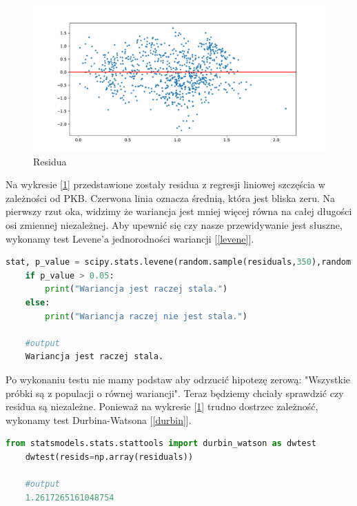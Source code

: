 \documentclass{article}
\theoremstyle{break}
\begin{document}
\begin{figure}[H]
	\begin{center}
		\includegraphics[scale=0.5]{res.pdf}
		\caption{Residua}
		\label{fig:res}
	\end{center}
\end{figure}

Na wykresie [\ref{fig:res}] przedstawione zostały residua z regresji liniowej szczęścia w zależności od PKB. Czerwona linia oznacza średnią, która jest bliska zeru. Na pierwszy rzut oka, widzimy że wariancja jest mniej więcej równa na całej długości osi zmiennej niezależnej. Aby upewnić się czy nasze przewidywanie jest słuszne, wykonamy test Levene'a jednorodności wariancji [\ref{levene}]. 

\begin{lstlisting}[language=Python, caption=Test Levene'a, label={levene}]
	stat, p_value = scipy.stats.levene(random.sample(residuals,350),random.sample(residuals,350))
	if p_value > 0.05:
		print("Wariancja jest raczej stala.")
	else:
		print("Wariancja raczej nie jest stala.")
		
	#output
	Wariancja jest raczej stala.
\end{lstlisting}

Po wykonaniu testu nie mamy podstaw aby odrzucić hipotezę zerową: "Wszystkie próbki są z populacji o równej wariancji". Teraz będziemy chciały sprawdzić czy residua są niezależne. Ponieważ na wykresie [\ref{fig:res}] trudno dostrzec zależność, wykonamy test Durbina-Watsona [\ref{durbin}].

\begin{lstlisting}[language=Python, caption=Test Levene'a, label={durbin}]
	from statsmodels.stats.stattools import durbin_watson as dwtest
	dwtest(resids=np.array(residuals))
	
	#output
	1.2617265161048754
\end{lstlisting}
\end{document}

